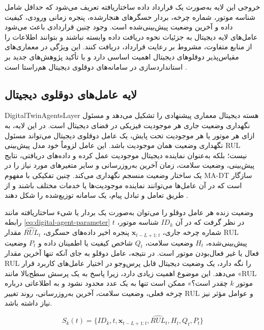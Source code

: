 \documentclass[a4paper,fleqn]{report}
\begin{document}
خروجی این لایه به‌صورت یک قرارداد داده ساختاریافته تعریف می‌شود که حداقل شامل شناسه موتور، شماره چرخه، بردار حسگرهای هنجارشده، پنجره زمانی ورودی، کیفیت داده و آخرین وضعیت پیش‌بینی‌شده است. وجود چنین قراردادی باعث می‌شود عامل‌های لایه دیجیتال به جزئیات نحوه دریافت داده وابسته نباشند و بتوانند اطلاعات را از منابع متفاوت، مشروط بر رعایت قرارداد، دریافت کنند. این ویژگی در معماری‌های مقیاس‌پذیر دوقلوهای دیجیتال اهمیت اساسی دارد و با تأکید پژوهش‌های جدید بر استانداردسازی در سامانه‌های دوقلوی دیجیتال هم‌راستا است \cite{park2026hybriddt,fu2026genaidt}.


\subsection{لایه عامل‌های دوقلوی دیجیتال}
\label{sec:layer-dt-agents}

\gls{DigitalTwinAgentsLayer} هسته دیجیتال معماری پیشنهادی را تشکیل می‌دهد و مسئول نگهداری وضعیت جاری هر موجودیت فیزیکی در فضای دیجیتال است. در این لایه، به ازای هر موتور یا هر موجودیت تحت پایش، یک عامل دوقلوی دیجیتال می‌تواند مسئول نگهداری وضعیت همان موجودیت باشد. این عامل لزوماً خود مدل پیش‌بینی \gls{RUL} نیست؛ بلکه به‌عنوان نماینده دیجیتال موجودیت عمل کرده و داده‌های دریافتی، نتایج پیش‌بینی، وضعیت سلامت، زمان آخرین به‌روزرسانی و سایر متغیرهای مورد نیاز را در یک ساختار وضعیت منسجم نگهداری می‌کند. چنین تفکیکی با مفهوم \gls{MA-DT} سازگار است که در آن عامل‌ها می‌توانند نماینده موجودیت‌ها یا خدمات مختلف باشند و از طریق تعامل و تبادل پیام، یک سامانه توزیع‌شده را شکل دهند \cite{pretel2022masdt,lopez2024madtwin,wang2024multiagent}.

وضعیت زنده هر عامل دوقلو را می‌توان به‌صورت یک بردار یا شیء ساختاریافته مانند رابطه \eqref{eq:digital-agent-parameter} در نظر گرفت که در آن $ID_k$ شناسه موتور، $t$ شماره چرخه جاری، $\mathbf{x}_{t-L+1:t}$ پنجره اخیر داده‌های حسگری، $\widehat{RUL}_t$ مقدار \gls{RUL} پیش‌بینی‌شده، $H_t$ وضعیت سلامت، $Q_t$ شاخص کیفیت یا اطمینان داده و $P_t$ وضعیت فعال یا غیر فعال‌بودن موتور است. در نتیجه، عامل دوقلو به جای آنکه تنها آخرین مقدار \gls{RUL} را نگه دارد، یک وضعیت دیجیتال قابل پرس‌وجو در اختیار عامل‌های کاربرد قرار می‌دهد. این موضوع اهمیت زیادی دارد، زیرا پاسخ به یک پرسش سطح‌بالا مانند «\gls{RUL} موتور $k$ چقدر است؟» ممکن است تنها به یک عدد محدود نشود و به اطلاعاتی درباره چرخه فعلی، وضعیت سلامت، آخرین به‌روزرسانی، روند تغییر \gls{RUL} و عوامل مؤثر نیز نیاز داشته باشد.

\begin{equation}\label{eq:digital-agent-parameter}
 S_k(t)=\{ID_k,t,\mathbf{x}_{t-L+1:t},\widehat{RUL}_t,H_t,Q_t,P_t\}
\end{equation}
\end{document}
